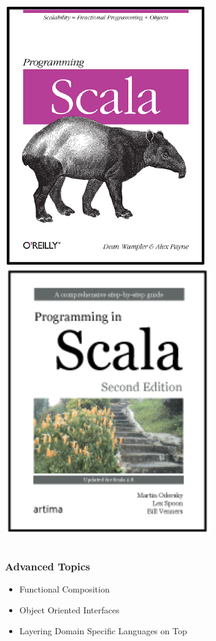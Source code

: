\documentclass[xcolor=pdflatex,dvipsnames,table]{beamer}
\begin{document}
\begin{frame}
\begin{columns}
\begin{center}
\includegraphics[height=0.4\textheight]{../bootcamp/figs/programming-scala.pdf} \\
\includegraphics[height=0.4\textheight]{../bootcamp/figs/programming-in-scala.pdf}
\end{center}

\end{columns}
\end{frame}

\begin{frame}
\frametitle{Advanced Topics}
\begin{itemize}
\item Functional Composition
\item Object Oriented Interfaces
\item Layering Domain Specific Languages on Top
\end{itemize}
\end{frame}
\end{document}
